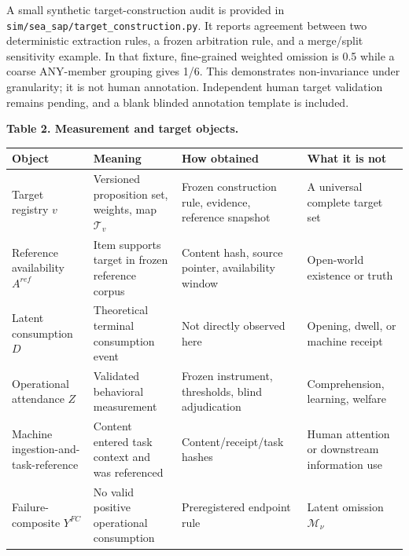 \documentclass[
  11pt]{article}
\begin{document}
A small synthetic target-construction audit is provided in
\texttt{sim/sea\_sap/target\_construction.py}. It reports agreement
between two deterministic extraction rules, a frozen arbitration rule,
and a merge/split sensitivity example. In that fixture, fine-grained
weighted omission is 0.5 while a coarse ANY-member grouping gives 1/6.
This demonstrates non-invariance under granularity; it is not human
annotation. Independent human target validation remains pending, and a
blank blinded annotation template is included.

\textbf{Table 2. Measurement and target objects.}

\begin{longtable}[]{@{}
  >{\raggedright\arraybackslash}p{}
  >{\raggedright\arraybackslash}p{}
  >{\raggedright\arraybackslash}p{}
  >{\raggedright\arraybackslash}p{}@{}}
\toprule\noalign{}
\begin{minipage}[b]{\linewidth}\raggedright
Object
\end{minipage} & \begin{minipage}[b]{\linewidth}\raggedright
Meaning
\end{minipage} & \begin{minipage}[b]{\linewidth}\raggedright
How obtained
\end{minipage} & \begin{minipage}[b]{\linewidth}\raggedright
What it is not
\end{minipage} \\
\midrule\noalign{}
\endhead
\bottomrule\noalign{}
\endlastfoot
Target registry \(v\) & Versioned proposition set, weights, map
\(\mathcal T_v\) & Frozen construction rule, evidence, reference
snapshot & A universal complete target set \\
Reference availability \(A^{ref}\) & Item supports target in frozen
reference corpus & Content hash, source pointer, availability window &
Open-world existence or truth \\
Latent consumption \(D\) & Theoretical terminal consumption event & Not
directly observed here & Opening, dwell, or machine receipt \\
Operational attendance \(Z\) & Validated behavioral measurement & Frozen
instrument, thresholds, blind adjudication & Comprehension, learning,
welfare \\
Machine ingestion-and-task-reference & Content entered task context and
was referenced & Content/receipt/task hashes & Human attention or
downstream information use \\
Failure-composite \(Y^{FC}\) & No valid positive operational consumption
& Preregistered endpoint rule & Latent omission \(\mathcal M_\nu\) \\
\end{longtable}
\end{document}
